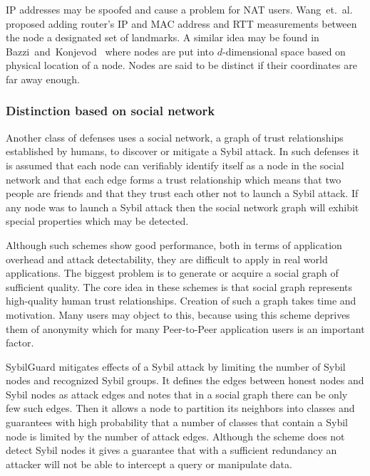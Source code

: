   IP addresses may be spoofed and cause a problem for NAT users.
  Wang~et.~al.~\cite{wan05} proposed adding router's IP and MAC address
  and RTT measurements between the node a designated set of landmarks. A similar
  idea may be found in Bazzi~and~Konjevod~\cite{baz05} where nodes are put
  into $d$-dimensional space based on physical location of a node. Nodes are
  said to be distinct if their coordinates are far away enough.

  \subsubsection{Distinction based on social network}

  Another class of defenses uses a social network, a graph of trust
  relationships established by humans, to discover or mitigate a Sybil attack.
  In such defenses it is assumed that each node can verifiably identify itself
  as a node in the social network and that each edge forms a trust relationship
  which means that two people are friends and that they trust each other not to
  launch a Sybil attack. If any node was to launch a Sybil attack then the
  social network graph will exhibit special properties which may be detected. 

  Although such schemes show good performance, both in terms of application
  overhead and attack detectability, they are difficult to apply in real world
  applications. The biggest problem is to generate or acquire a social graph of
  sufficient quality. The core idea in these schemes is that social graph
  represents high-quality human trust relationships. Creation of such a graph
  takes time and motivation. Many users may object to this, because using this
  scheme deprives them of anonymity which for many Peer-to-Peer application
  users is an important factor.

  SybilGuard \cite{hai06} mitigates effects of a Sybil attack by limiting the
  number of Sybil nodes and recognized Sybil groups. It defines the edges
  between honest nodes and Sybil nodes as attack edges and notes that in a
  social graph there can be only few such edges. Then it allows a node to
  partition its neighbors into classes and guarantees with high probability
  that a number of classes that contain a Sybil node is limited by the number of
  attack edges. Although the scheme does not detect Sybil nodes it gives a
  guarantee that with a sufficient redundancy an attacker will not be able to
  intercept a query or manipulate data.


